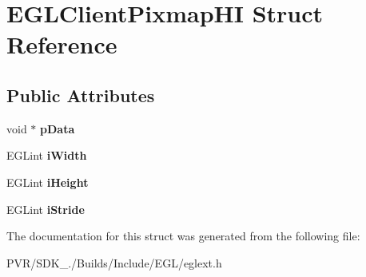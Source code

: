 \hypertarget{struct_e_g_l_client_pixmap_h_i}{\section{E\+G\+L\+Client\+Pixmap\+H\+I Struct Reference}
\label{struct_e_g_l_client_pixmap_h_i}
}
\subsection*{Public Attributes}
\begin{DoxyCompactItemize}
\item 
\hypertarget{struct_e_g_l_client_pixmap_h_i_a2c8c1cbd4e5975422f316e4540106eee}{void $\ast$ {\bfseries p\+Data}}\label{struct_e_g_l_client_pixmap_h_i_a2c8c1cbd4e5975422f316e4540106eee}

\item 
\hypertarget{struct_e_g_l_client_pixmap_h_i_a90346094b9696ba370824167d60d8217}{E\+G\+Lint {\bfseries i\+Width}}\label{struct_e_g_l_client_pixmap_h_i_a90346094b9696ba370824167d60d8217}

\item 
\hypertarget{struct_e_g_l_client_pixmap_h_i_a963f9b039c1f92713b9849f006a62241}{E\+G\+Lint {\bfseries i\+Height}}\label{struct_e_g_l_client_pixmap_h_i_a963f9b039c1f92713b9849f006a62241}

\item 
\hypertarget{struct_e_g_l_client_pixmap_h_i_ab89de5b8de06f1886a3d86d8ec6794b2}{E\+G\+Lint {\bfseries i\+Stride}}\label{struct_e_g_l_client_pixmap_h_i_ab89de5b8de06f1886a3d86d8ec6794b2}

\end{DoxyCompactItemize}


The documentation for this struct was generated from the following file\+:\begin{DoxyCompactItemize}
\item 
P\+V\+R/\+S\+D\+K\+\_./\+Builds/\+Include/\+E\+G\+L/eglext.\+h\end{DoxyCompactItemize}
